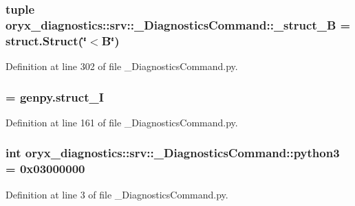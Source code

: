 \subsubsection[{\-\_\-struct\-\_\-\-B}]{\setlength{\rightskip}{0pt plus 5cm}tuple {\bf oryx\-\_\-diagnostics\-::srv\-::\-\_\-\-Diagnostics\-Command\-::\-\_\-struct\-\_\-\-B} = struct.\-Struct(\char`\"{}$<$\-B\char`\"{})}\label{namespaceoryx__diagnostics_1_1srv_1_1__DiagnosticsCommand_a832dd6e564882d61792d8d45bfc68006}


\-Definition at line 302 of file \-\_\-\-Diagnostics\-Command.\-py.

\subsubsection[{\-\_\-struct\-\_\-\-I}]{ = genpy.\-struct\-\_\-\-I}\label{namespaceoryx__diagnostics_1_1srv_1_1__DiagnosticsCommand_ae35183fa30b595f612822188472d7a7b}


\-Definition at line 161 of file \-\_\-\-Diagnostics\-Command.\-py.

\subsubsection[{python3}]{\setlength{\rightskip}{0pt plus 5cm}int {\bf oryx\-\_\-diagnostics\-::srv\-::\-\_\-\-Diagnostics\-Command\-::python3} = 0x03000000}\label{namespaceoryx__diagnostics_1_1srv_1_1__DiagnosticsCommand_a1c0c63d0ada4edfb200da40c2aca93c7}


\-Definition at line 3 of file \-\_\-\-Diagnostics\-Command.\-py.

